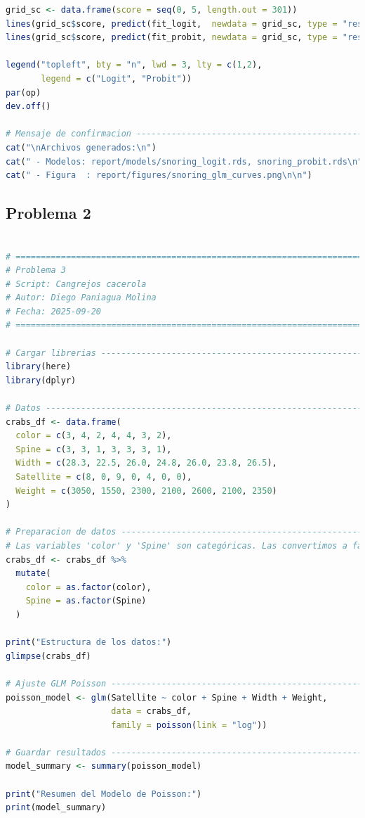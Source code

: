 \begin{lstlisting}[language=R, caption={Script: Ronquido y enfermedad cardiaca}, label={lst:script1}]
grid_sc <- data.frame(score = seq(0, 5, length.out = 301))
lines(grid_sc$score, predict(fit_logit,  newdata = grid_sc, type = "response"), lwd = 3)
lines(grid_sc$score, predict(fit_probit, newdata = grid_sc, type = "response"), lwd = 3, lty = 2)

legend("topleft", bty = "n", lwd = 3, lty = c(1,2),
       legend = c("Logit", "Probit"))
par(op)
dev.off()

# Mensaje de confirmacion -----------------------------------------------------
cat("\nArchivos generados:\n")
cat(" - Modelos: report/models/snoring_logit.rds, snoring_probit.rds\n")
cat(" - Figura  : report/figures/snoring_glm_curves.png\n\n")

\end{lstlisting}

\clearpage

\subsection{Problema \textcolor{CIMATRed}{2}}

\begin{lstlisting}[language=R, caption={Script: Cangrejos cacerola}, label={lst:script4}]

# =============================================================================
# Problema 3 
# Script: Cangrejos cacerola
# Autor: Diego Paniagua Molina
# Fecha: 2025-09-20
# =============================================================================

# Cargar librerias ------------------------------------------------------------
library(here)
library(dplyr) 

# Datos -----------------------------------------------------------------------
crabs_df <- data.frame(
  color = c(3, 4, 2, 4, 4, 3, 2),
  Spine = c(3, 3, 1, 3, 3, 3, 1),
  Width = c(28.3, 22.5, 26.0, 24.8, 26.0, 23.8, 26.5),
  Satellite = c(8, 0, 9, 0, 4, 0, 0),
  Weight = c(3050, 1550, 2300, 2100, 2600, 2100, 2350)
)

# Preparacion de datos -------------------------------------------------------
# Las variables 'color' y 'Spine' son categóricas. Las convertimos a factores.
crabs_df <- crabs_df %>%
  mutate(
    color = as.factor(color),
    Spine = as.factor(Spine)
  )

print("Estructura de los datos:")
glimpse(crabs_df)

# Ajuste GLM Poisson ----------------------------------------------------------
poisson_model <- glm(Satellite ~ color + Spine + Width + Weight, 
                     data = crabs_df, 
                     family = poisson(link = "log"))

# Guardar resultados ----------------------------------------------------------
model_summary <- summary(poisson_model)

print("Resumen del Modelo de Poisson:")
print(model_summary)

\end{lstlisting}



